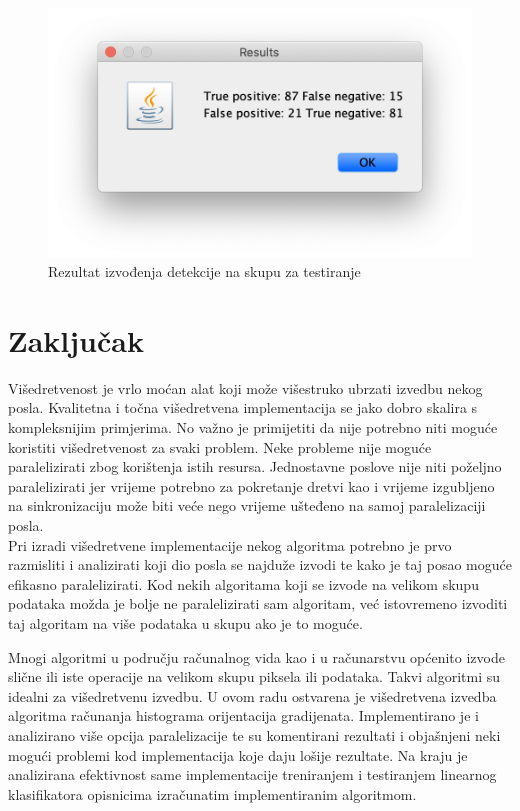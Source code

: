 \documentclass[times, utf8, zavrsni]{fer}
\begin{document}
\begin{figure}[htb]
	\centering
	\includegraphics[width=0.7\linewidth]{figures/accuracy.png}
	\caption{Rezultat izvođenja detekcije na skupu za testiranje}
	\label{fig:accuracy}
\end{figure}

\chapter{Zaključak}
Višedretvenost je vrlo moćan alat koji može višestruko ubrzati izvedbu nekog posla. Kvalitetna i točna višedretvena implementacija se jako dobro skalira s kompleksnijim primjerima. No važno je primijetiti da nije potrebno niti moguće koristiti višedretvenost za svaki problem. Neke probleme nije moguće paralelizirati zbog korištenja istih resursa. Jednostavne poslove nije niti poželjno paralelizirati jer vrijeme potrebno za pokretanje dretvi kao i vrijeme izgubljeno na sinkronizaciju može biti veće nego vrijeme ušteđeno na samoj paralelizaciji posla. \\

Pri izradi višedretvene implementacije nekog algoritma potrebno je prvo razmisliti i analizirati koji dio posla se najduže izvodi te kako je taj posao moguće efikasno paralelizirati. Kod nekih algoritama koji se izvode na velikom skupu podataka možda je bolje ne paralelizirati sam algoritam, već istovremeno izvoditi taj algoritam na više podataka u skupu ako je to moguće.




\begin{sazetak}
Mnogi algoritmi u području računalnog vida kao i u računarstvu općenito izvode slične ili iste operacije na velikom skupu piksela ili podataka. Takvi algoritmi su idealni za višedretvenu izvedbu. U ovom radu ostvarena je višedretvena izvedba algoritma računanja histograma orijentacija gradijenata. Implementirano je i analizirano više opcija paralelizacije te su komentirani rezultati i objašnjeni neki mogući problemi kod implementacija koje daju lošije rezultate. Na kraju je analizirana efektivnost same implementacije treniranjem i testiranjem linearnog klasifikatora opisnicima izračunatim implementiranim algoritmom.

\end{sazetak}
\end{document}
